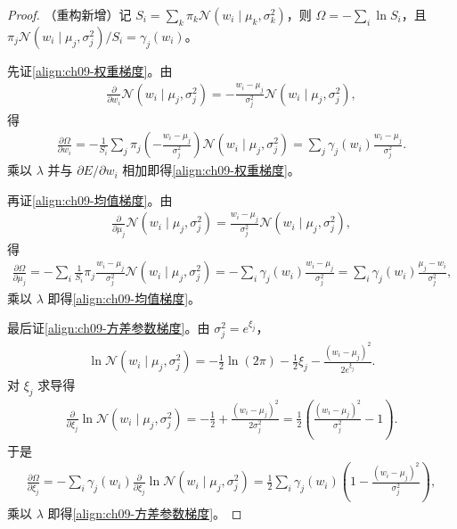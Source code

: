 \documentclass[../../main.tex]{subfiles}
\begin{document}
\begin{proof}
（重构新增）记 $S_{i}=\sum_{k}\pi_{k}\mathcal{N}(w_{i}\mid\mu_{k},\sigma_{k}^{2})$，则 $\Omega=-\sum_{i}\ln S_{i}$，且 $\pi_{j}\mathcal{N}(w_{i}\mid\mu_{j},\sigma_{j}^{2})/S_{i}=\gamma_{j}(w_{i})$。

先证\eqref{align:ch09-权重梯度}。由
\begin{align*}
\frac{\partial}{\partial w_{i}}\mathcal{N}(w_{i}\mid\mu_{j},\sigma_{j}^{2})=-\frac{w_{i}-\mu_{j}}{\sigma_{j}^{2}}\mathcal{N}(w_{i}\mid\mu_{j},\sigma_{j}^{2}),
\end{align*}
得
\begin{align*}
\frac{\partial\Omega}{\partial w_{i}}=-\frac{1}{S_{i}}\sum_{j}\pi_{j}\left(-\frac{w_{i}-\mu_{j}}{\sigma_{j}^{2}}\right)\mathcal{N}(w_{i}\mid\mu_{j},\sigma_{j}^{2})=\sum_{j}\gamma_{j}(w_{i})\frac{w_{i}-\mu_{j}}{\sigma_{j}^{2}}.
\end{align*}
乘以 $\lambda$ 并与 $\partial E/\partial w_{i}$ 相加即得\eqref{align:ch09-权重梯度}。

再证\eqref{align:ch09-均值梯度}。由
\begin{align*}
\frac{\partial}{\partial\mu_{j}}\mathcal{N}(w_{i}\mid\mu_{j},\sigma_{j}^{2})=\frac{w_{i}-\mu_{j}}{\sigma_{j}^{2}}\mathcal{N}(w_{i}\mid\mu_{j},\sigma_{j}^{2}),
\end{align*}
得
\begin{align*}
\frac{\partial\Omega}{\partial\mu_{j}}=-\sum_{i}\frac{1}{S_{i}}\pi_{j}\frac{w_{i}-\mu_{j}}{\sigma_{j}^{2}}\mathcal{N}(w_{i}\mid\mu_{j},\sigma_{j}^{2})=-\sum_{i}\gamma_{j}(w_{i})\frac{w_{i}-\mu_{j}}{\sigma_{j}^{2}}=\sum_{i}\gamma_{j}(w_{i})\frac{\mu_{j}-w_{i}}{\sigma_{j}^{2}},
\end{align*}
乘以 $\lambda$ 即得\eqref{align:ch09-均值梯度}。

最后证\eqref{align:ch09-方差参数梯度}。由 $\sigma_{j}^{2}=e^{\xi_{j}}$，
\begin{align*}
\ln\mathcal{N}(w_{i}\mid\mu_{j},\sigma_{j}^{2})=-\frac{1}{2}\ln(2\pi)-\frac{1}{2}\xi_{j}-\frac{(w_{i}-\mu_{j})^{2}}{2e^{\xi_{j}}}.
\end{align*}
对 $\xi_{j}$ 求导得
\begin{align*}
\frac{\partial}{\partial\xi_{j}}\ln\mathcal{N}(w_{i}\mid\mu_{j},\sigma_{j}^{2})=-\frac{1}{2}+\frac{(w_{i}-\mu_{j})^{2}}{2\sigma_{j}^{2}}=\frac{1}{2}\left(\frac{(w_{i}-\mu_{j})^{2}}{\sigma_{j}^{2}}-1\right).
\end{align*}
于是
\begin{align*}
\frac{\partial\Omega}{\partial\xi_{j}}=-\sum_{i}\gamma_{j}(w_{i})\frac{\partial}{\partial\xi_{j}}\ln\mathcal{N}(w_{i}\mid\mu_{j},\sigma_{j}^{2})=\frac{1}{2}\sum_{i}\gamma_{j}(w_{i})\left(1-\frac{(w_{i}-\mu_{j})^{2}}{\sigma_{j}^{2}}\right),
\end{align*}
乘以 $\lambda$ 即得\eqref{align:ch09-方差参数梯度}。
\end{proof}
\end{document}
